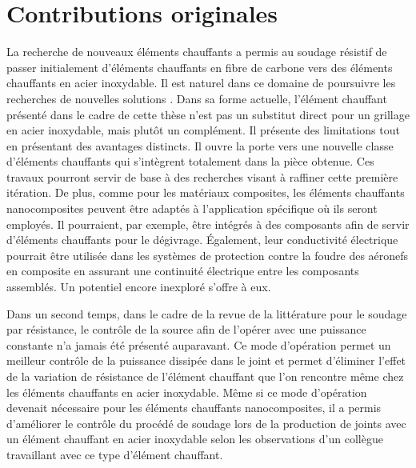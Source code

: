 \label{sec:Contributions}

\section{Contributions originales}

La recherche de nouveaux éléments chauffants a permis au soudage résistif de passer initialement d'éléments chauffants en fibre de carbone vers des éléments chauffants en acier inoxydable. 
Il est naturel dans ce domaine de poursuivre les recherches de nouvelles solutions \cite{Russello2019}. 
Dans sa forme actuelle, l'élément chauffant présenté dans le cadre de cette thèse n'est pas un substitut direct pour un grillage en acier inoxydable, mais plutôt un complément. 
Il présente des limitations tout en présentant des avantages distincts.
Il ouvre la porte vers une nouvelle classe d'éléments chauffants qui s'intègrent totalement dans la pièce obtenue. 
Ces travaux pourront servir de base à des recherches visant à raffiner cette première itération. 
De plus, comme pour les matériaux composites, les éléments chauffants nanocomposites peuvent être adaptés à l'application spécifique où ils seront employés. 
Il pourraient, par exemple, être intégrés à des composants afin de servir d'éléments chauffants pour le dégivrage. 
Également, leur conductivité électrique pourrait être utilisée dans les systèmes de protection contre la foudre des aéronefs en composite en assurant une continuité électrique entre les composants assemblés. 
Un potentiel encore inexploré s'offre à eux. 

Dans un second temps, dans le cadre de la revue de la littérature pour le soudage par résistance, le contrôle de la source afin de l'opérer avec une puissance constante n'a jamais été présenté auparavant.  
Ce mode d'opération permet un meilleur contrôle de la puissance dissipée dans le joint et permet d'éliminer l'effet de la variation de résistance de l'élément chauffant que l'on rencontre même chez les éléments chauffants en acier inoxydable. 
Même si ce mode d'opération devenait nécessaire pour les éléments chauffants nanocomposites, il a permis d'améliorer le contrôle du procédé de soudage lors de la production de joints avec un élément chauffant en acier inoxydable selon les observations d'un collègue travaillant avec ce type d'élément chauffant. 

